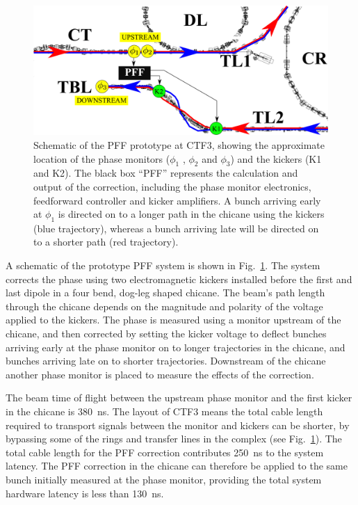 \documentclass[%
 reprint,
superscriptaddress,
 amsmath,amssymb,
 prl,
]{revtex4-1}
\begin{document}

\begin{figure}
	\includegraphics[width=\columnwidth]{figs/ctfpffLayout}%
	\caption{\label{fig:pffLayout}Schematic of the PFF prototype at CTF3, 
	showing the approximate location of the phase monitors (\(\phi_1\) , 
	\(\phi_2\) and \(\phi_3\)) and
		the kickers (K1 and K2). The black box “PFF” represents the calculation 
		and output of the correction, including the phase monitor
		electronics, feedforward controller and kicker amplifiers. A bunch 
		arriving early at \(\phi_1\) is directed on to a longer path in the
		chicane
		using the kickers (blue trajectory), whereas a bunch arriving late will 
		be directed on to a shorter path (red trajectory). }
\end{figure}

A schematic of the prototype PFF system is shown in Fig.~\ref{fig:pffLayout}. 
The system corrects the phase using two electromagnetic kickers installed 
before the first and last dipole in a four bend, dog-leg shaped chicane. The 
beam's path length through the chicane depends on the magnitude and polarity of 
the voltage applied to the kickers. The phase is measured using a monitor 
upstream of the chicane, and then corrected by setting the kicker voltage to 
deflect bunches arriving early at the phase monitor on to longer trajectories 
in the chicane, and bunches arriving late on to shorter trajectories. 
Downstream of the chicane another phase monitor is placed to measure the 
effects of the correction.

The beam time of flight between the upstream phase monitor and the first kicker 
in the chicane is 380~ns. The layout of CTF3  means the total cable length 
required to transport signals between the monitor and kickers can be shorter, 
by bypassing some of the rings and transfer lines in the complex (see 
Fig.~\ref{fig:pffLayout}). The total cable length for the PFF correction 
contributes 250~ns to the system latency. The PFF correction in the chicane can 
therefore be applied to the same bunch initially measured at the phase monitor, 
providing the total system hardware latency is less than 130~ns. 
\end{document}

